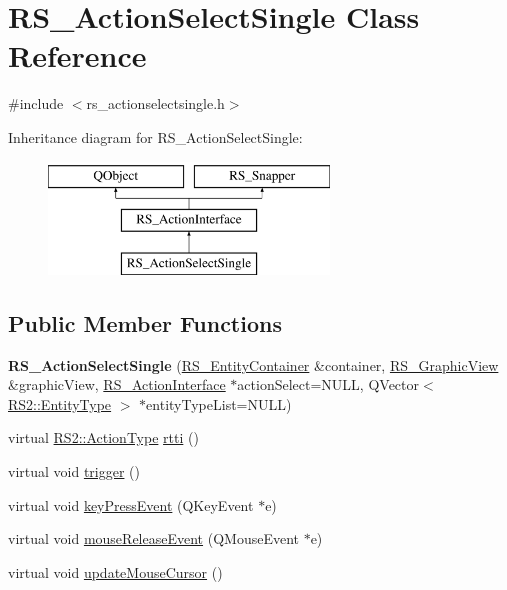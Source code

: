 \hypertarget{classRS__ActionSelectSingle}{\section{R\-S\-\_\-\-Action\-Select\-Single Class Reference}
\label{classRS__ActionSelectSingle}
}


{\ttfamily \#include $<$rs\-\_\-actionselectsingle.\-h$>$}

Inheritance diagram for R\-S\-\_\-\-Action\-Select\-Single\-:\begin{figure}[H]
\begin{center}
\leavevmode
\includegraphics[height=3.000000cm]{classRS__ActionSelectSingle}
\end{center}
\end{figure}
\subsection*{Public Member Functions}
\begin{DoxyCompactItemize}
\item 
\hypertarget{classRS__ActionSelectSingle_a5a42e24edf8a0d96c5808e5d0a5cd344}{{\bfseries R\-S\-\_\-\-Action\-Select\-Single} (\hyperlink{classRS__EntityContainer}{R\-S\-\_\-\-Entity\-Container} \&container, \hyperlink{classRS__GraphicView}{R\-S\-\_\-\-Graphic\-View} \&graphic\-View, \hyperlink{classRS__ActionInterface}{R\-S\-\_\-\-Action\-Interface} $\ast$action\-Select=N\-U\-L\-L, Q\-Vector$<$ \hyperlink{classRS2_a8f26d1b981e1e85cff16738b43337e6a}{R\-S2\-::\-Entity\-Type} $>$ $\ast$entity\-Type\-List=N\-U\-L\-L)}\label{classRS__ActionSelectSingle_a5a42e24edf8a0d96c5808e5d0a5cd344}

\item 
virtual \hyperlink{classRS2_afe3523e0bc41fd637b892321cfc4b9d7}{R\-S2\-::\-Action\-Type} \hyperlink{classRS__ActionSelectSingle_a08df28f56d4ae796d89900e67733a4c0}{rtti} ()
\item 
virtual void \hyperlink{classRS__ActionSelectSingle_a7f775f09569616bf3a505154e51b7bd7}{trigger} ()
\item 
virtual void \hyperlink{classRS__ActionSelectSingle_aaa2f18ae54d56d58969eef5012d97f62}{key\-Press\-Event} (Q\-Key\-Event $\ast$e)
\item 
virtual void \hyperlink{classRS__ActionSelectSingle_a73420e820ddcddc199c685041a7a805a}{mouse\-Release\-Event} (Q\-Mouse\-Event $\ast$e)
\item 
virtual void \hyperlink{classRS__ActionSelectSingle_a0390e192da1d38b8687472fc38acb4ad}{update\-Mouse\-Cursor} ()
\end{DoxyCompactItemize}

